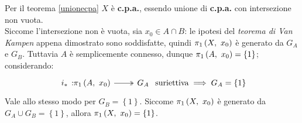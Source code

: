 \begin{demonstration}
	Per il teorema \ref{unionecpa} $X$ è \textbf{c.p.a.}, essendo unione di \textbf{c.p.a.} con intersezione non vuota.\\
	Siccome l'intersezione non è vuota, sia $x_0\in A\cap B$: le ipotesi del \textit{teorema di Van Kampen} appena dimostrato sono soddisfatte, quindi $\gruf{X}{x_0}$ è generato da $G_A$ e $G_B$. Tuttavia $A$ è semplicemente connesso, dunque $\gruf{A}{x_0}=\left\{1\right\}$; considerando:
	\begin{equation*}
		\surr {i_\ast} {\gruf{A}{x_0}} {G_A}\text{ suriettiva}\implies G_A=\left\{1\right\}
	\end{equation*}
	Vale allo stesso modo per $G_B=\left\{1\right\}$. Siccome $\gruf{X}{x_0}$ è generato da $G_A\cup G_B=\left\{1\right\}$, allora $\gruf{X}{x_0}=\left\{1\right\}$.
\end{demonstration}
